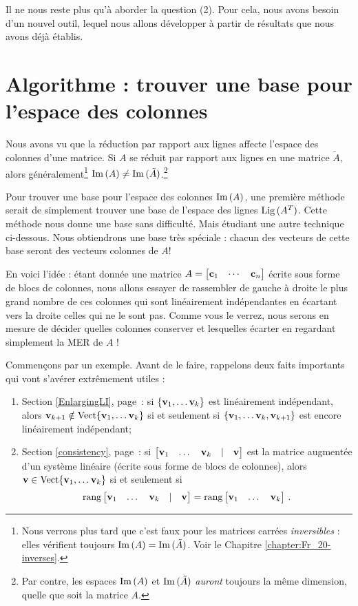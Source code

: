 Il ne nous reste plus qu'à aborder la question (2). Pour cela, nous avons besoin d'un nouvel outil, lequel nous allons développer à partir de r\'esultats que nous avons déjà \'etablis.

\section{Algorithme : trouver une base pour l'espace des colonnes}

Nous avons vu que la réduction par rapport aux lignes affecte l'espace des colonnes d'une matrice. Si  $A$ se réduit par rapport aux lignes en une matrice $\tilde A$,
alors généralement\footnote{Nous verrons plus tard que c'est faux pour les matrices carrées {\it inversibles} : elles vérifient toujours $\operatorname{Im}\,(A) = \operatorname{Im}\,(\tilde A)$. Voir le Chapitre \ref{chapter:Fr_20-inverses}.} $\operatorname{Im}\,(A) \neq \operatorname{Im}\,(\tilde A)$.\footnote{Par contre, les espaces $\operatorname{Im}\,(A)$ et $\operatorname{Im}\,(\tilde A)$ {\it auront} toujours la même dimension, quelle que soit la matrice $A$.} 

Pour trouver une base pour l'espace des colonnes $\operatorname{Im}\,(A)$, une première méthode serait de simplement trouver une base de l'espace des lignes $\operatorname{Lig\,}(A^T)$. Cette méthode nous donne une base sans difficulté. Mais étudiant une autre technique ci-dessous. Nous obtiendrons une base très spéciale : chacun des vecteurs de cette base seront des vecteurs colonnes de $A$!

En voici l'idée : étant donnée une matrice $A=\left[ \begin{matrix} \mathbf{c}_1& \cdots & \mathbf{c}_n \end{matrix} \right]$ écrite sous forme de blocs de colonnes, nous allons essayer de rassembler de gauche à droite le plus grand nombre de ces colonnes qui sont linéairement indépendantes en écartant vers la droite celles qui ne le sont pas. Comme vous le verrez, nous serons en mesure de décider quelles colonnes conserver et lesquelles écarter en regardant simplement la MER de $A$ !

Commençons par un exemple. Avant de le faire, rappelons deux faits importants qui vont s'avérer extrêmement utiles :

\begin{enumerate} 
\item Section \ref{EnlargingLI}, page~\pageref{EnlargingLI}: si $\{\mathbf{v}_1, \dots \mathbf{v}_k\}$ est lin\'eairement ind\'ependant, alors $\mathbf{v}_{k+1} \notin \operatorname{ Vect} \normalsize\{\mathbf{v}_1, \dots \mathbf{v}_k\normalsize\}$ si et seulement si $\{\mathbf{v}_1, \dots \mathbf{v}_k, \mathbf{v}_{k+1}\}$ est encore lin\'eairement ind\'ependant; 
\medskip
\item Section \ref{consistency}, page~\pageref{consistency}: si $\left[ \begin{matrix} \mathbf{v}_1& \dots &\mathbf{v}_k&|& \mathbf{v} \end{matrix} \right]$ est la matrice augmentée d'un système linéaire (écrite sous forme  de blocs de colonnes), alors $\mathbf{v}\in \operatorname{ Vect} \normalsize\{\mathbf{v}_1, \dots \mathbf{v}_k\normalsize\}$ si et seulement si $$\textrm{rang}\left[ \begin{matrix} \mathbf{v}_1& \dots &\mathbf{v}_k&|& \mathbf{v} \end{matrix} \right]=\textrm{rang} \left[ \begin{matrix} \mathbf{v}_1& \dots &\mathbf{v}_k \end{matrix} \right]\,.$$
\end{enumerate}

